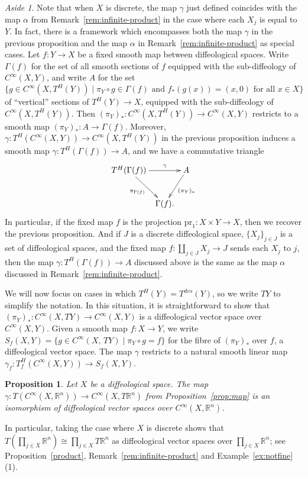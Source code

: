 \documentclass[12pt]{amsart}
\newtheorem{prop}[de]{Proposition}
\theoremstyle{remark}
\newtheorem{aside}[de]{Aside}
\newcommand{\ra}{\to}
\newcommand{\pr}{{\mathrm{pr}}}
\def \R{\mathbb{R}}
\begin{document}
\begin{aside}
Note that when $X$ is discrete, the map $\gamma$ just defined
coincides with the map $\alpha$ from Remark~\ref{rem:infinite-product}
in the case where each $X_j$ is equal to $Y$.
In fact, there is a framework which encompasses both the map $\gamma$ in the previous proposition
and the map $\alpha$ in Remark~\ref{rem:infinite-product} as special cases.
Let $f:Y \ra X$ be a fixed smooth map between diffeological spaces.
Write $\Gamma(f)$ for the set of all smooth sections of $f$ equipped with the sub-diffeology of $C^\infty(X,Y)$,
and write $A$ for the set $\{g \in C^\infty(X,T^H(Y)) \mid \pi_Y \circ g \in \Gamma(f) \text{ and } f_*(g(x))=(x,0) \text{ for all } x \in X\}$ of ``vertical'' sections of $T^H(Y) \to X$,
equipped with the sub-diffeology of $C^\infty(X,T^H(Y))$.
Then $(\pi_Y)_*:C^\infty(X,T^H(Y)) \ra C^\infty(X,Y)$ restricts to a smooth map $(\pi_Y)_*:A \ra \Gamma(f)$.
Moreover, $\gamma:T^H(C^\infty(X,Y)) \ra C^\infty(X,T^H(Y))$ in the previous proposition induces a smooth map $\gamma:T^H(\Gamma(f)) \ra A$,
and we have a commutative triangle
\[
\xymatrix@C5pt{T^H(\Gamma(f)) \ar[rr]^-{\gamma} \ar[dr]_{\pi_{\Gamma(f)}} && A \ar[dl]^{(\pi_Y)_*} \\ & \Gamma(f).}
\]
In particular,
if the fixed map $f$ is the projection $\pr_1:X \times Y \ra X$, then we recover the previous proposition.
And if $J$ is a discrete diffeological space, $\{X_j\}_{j \in J}$ is a set of diffeological spaces,
and the fixed map $f: \coprod_{j \in J} X_j \ra J$ sends each $X_j$ to $j$,
then the map $\gamma:T^H(\Gamma(f)) \ra A$ discussed above is the same as the map $\alpha$ discussed in Remark~\ref{rem:infinite-product}.
\end{aside}

%
%
%
%
%
%
%
%
%
%

We will now focus on cases in which $T^H(Y) = T^{dvs}(Y)$, so we write $TY$
to simplify the notation.
In this situation, it is straightforward to show that
$(\pi_Y)_*: C^\infty(X,TY) \ra C^\infty(X,Y)$
is a diffeological vector space over $C^\infty(X,Y)$.
Given a smooth map $f : X \to Y$, we write
$S_f(X,Y)=\{ g \in C^\infty(X, \, TY) \mid \pi_Y \circ g=f \}$
for the fibre of $(\pi_Y)_*$ over $f$, a diffeological vector space.
The map $\gamma$ restricts to a natural smooth linear map
$\gamma_f: T_f^H(C^\infty(X,Y)) \ra S_f(X,Y)$.

\begin{prop}\label{prop:isots}
Let $X$ be a diffeological space.
The map $\gamma:T(C^\infty(X,\R^n)) \ra C^\infty(X,T\R^n)$
from Proposition~\ref{prop:map} is an isomorphism of diffeological
vector spaces over $C^\infty(X,\R^n)$.
\end{prop}
%
%
In particular, taking the case where $X$ is discrete shows that
$T(\prod_{j \in X} \R^n) \cong \prod_{j \in X} T\R^n$ as diffeological vector spaces over $\prod_{j \in X} \R^n$;
see Proposition~\ref{product}, Remark~\ref{rem:infinite-product}
and Example~\ref{ex:notfine}(1).
\end{document}
